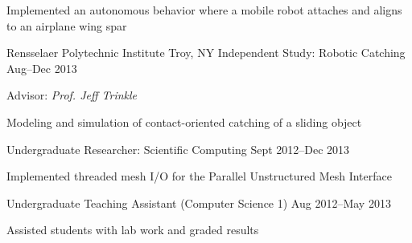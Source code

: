 \begin{cventries}
{\begin{cvitems}
    \item Implemented an autonomous behavior where a mobile robot attaches and
      aligns to an airplane wing spar
    \end{cvitems}
  }
  \cventrytwo
  {Rensselaer Polytechnic Institute}
  {Troy, NY}
  {Independent Study: Robotic Catching}
  {Aug--Dec 2013}
  {
    Advisor: \emph{Prof. Jeff Trinkle}\linebreak
    \begin{cvitems}
    \item Modeling and simulation of contact-oriented catching of a sliding object
    \end{cvitems}
  }
  {Undergraduate Researcher: Scientific Computing}
  {Sept 2012--Dec 2013}
  {
    \begin{cvitems}
    \item Implemented threaded mesh I/O for the Parallel Unstructured Mesh Interface
    \end{cvitems}
  }
  \cventry
  {}
  {}
  {Undergraduate Teaching Assistant (Computer Science 1)}
  {Aug 2012--May 2013}
  {
    \begin{cvitems}
    \item Assisted students with lab work and graded results
    \end{cvitems}
  }
\end{cventries}
